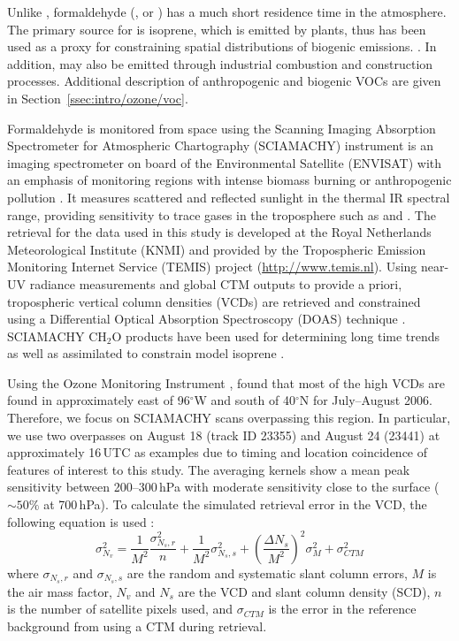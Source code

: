 Unlike , formaldehyde (, or ) has a much short residence time in the atmosphere. The primary source for  is isoprene, which
is emitted by plants, thus  has been used as a proxy for constraining spatial distributions of biogenic emissions. \citep[e.g.][]{Palmer:2006qf,Millet:2008oq,Marais:2012kl}.
In addition,  may also be emitted through industrial combustion and construction processes. Additional description of anthropogenic and biogenic VOCs are given
in Section~\ref{ssec:intro/ozone/voc}.

Formaldehyde is monitored from space using the Scanning Imaging Absorption Spectrometer for Atmospheric Chartography (SCIAMACHY) instrument is an imaging
spectrometer on board of the Environmental Satellite (ENVISAT) with an emphasis of monitoring regions with intense biomass burning or anthropogenic pollution
\citep{Burrows:1995fk,Bovensmann:1999uq}. It measures scattered and reflected sunlight in the thermal IR spectral range, providing sensitivity to trace gases in the
troposphere such as  and . The retrieval for the data used in this study is developed at the Royal Netherlands Meteorological Institute (KNMI)
and provided by the Tropospheric Emission Monitoring Internet Service (TEMIS) project (\url{http://www.temis.nl}). Using near-UV radiance measurements and global
CTM outputs to provide a priori,  tropospheric vertical column densities (VCDs) are retrieved and constrained using a Differential Optical Absorption
Spectroscopy (DOAS) technique \citep{De-Smedt:2008uq}. SCIAMACHY CH$_2$O products have been used for determining long time trends \citep{De-Smedt:2010kx} as
well as assimilated to constrain model isoprene \citep{Dufour:2009fk}.

Using the Ozone Monitoring Instrument \citep[OMI;][]{Levelt:2006kl}, \citet{Millet:2008oq} found that most of the high  VCDs are found in approximately east of
96$^\circ$W and south of 40$^\circ$N for July--August 2006. Therefore, we focus on SCIAMACHY scans overpassing this region. In particular, we use two overpasses
on August 18 (track ID 23355) and August 24 (23441) at approximately 16\,\unit{UTC} as examples due to timing and location coincidence of features of interest
to this study. The averaging kernels show a mean peak sensitivity between 200--300\,\unit{hPa} with moderate sensitivity close to the surface ($\sim50\%$ at 700\,\unit{hPa}).
To calculate the simulated retrieval error in the VCD, the following equation is used \citep[after][]{Boersma:2004uq,De-Smedt:2008uq}:
\begin{equation}\label{eqn:hcho_vcde}
	\sigma^2_{N_v} = \frac1{M^2}\frac{\sigma^2_{N_s,r}}{n}+\frac{1}{M^2}\sigma^2_{N_s,s}+\left(\frac{\Delta N_s}{M^2}\right)^2\sigma^2_M+\sigma^2_{CTM}
\end{equation}
where $\sigma_{N_s,r}$ and $\sigma_{N_s,s}$ are the random and systematic slant column errors, $M$ is the air mass factor, $N_v$ and $N_s$ are the VCD and slant column
density (SCD), $n$ is the number of satellite pixels used, and $\sigma_{CTM}$ is the error in the reference background from using a CTM during retrieval.


